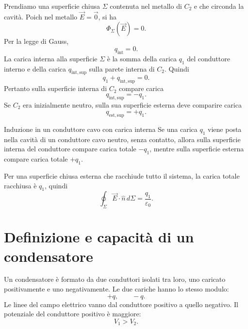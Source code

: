 \documentclass[a4paper]{article}
\begin{document}
Prendiamo una superficie chiusa \(\Sigma\) contenuta nel metallo di \(C_2\) e che circonda la cavità. Poich nel metallo \(\vec{E}=\vec{0}\), si ha
\[
    \Phi_\Sigma(\vec{E})=0.
\]
Per la legge di Gauss,
\[
    q_{\mathrm{int}}=0.
\]
La carica interna alla superficie \(\Sigma\) è la somma della carica \(q_1\) del conduttore interno e della carica \(q_{\mathrm{int,sup}}\) sulla parete interna di \(C_2\). Quindi
\[
    q_1+q_{\mathrm{int,sup}}=0.
\]
Pertanto sulla superficie interna di \(C_2\) compare carica
\[
    q_{\mathrm{int,sup}}=-q_1.
\]
Se \(C_2\) era inizialmente neutro, sulla sua superficie esterna deve comparire carica
\[
    q_{\mathrm{est,sup}}=+q_1.
\]

\begin{snippettheorem}{Induzione in un conduttore cavo con carica interna}
    Se una carica \(q_1\) viene posta nella cavità di un conduttore cavo neutro, senza contatto, allora sulla superficie interna del conduttore compare carica totale \(-q_1\), mentre sulla superficie esterna compare carica totale \(+q_1\).
\end{snippettheorem}

Per una superficie chiusa esterna che racchiude tutto il sistema, la carica totale racchiusa è \(q_1\), quindi
\[
    \oint_\Sigma \vec{E}\cdot\hat{n}\,d\Sigma=\frac{q_1}{\varepsilon_0}.
\]

\section{Definizione e capacità di un condensatore}

Un condensatore è formato da due conduttori isolati tra loro, uno caricato positivamente e uno negativamente. Le due cariche hanno lo stesso modulo:
\[
    +q,
    \qquad
    -q.
\]
Le linee del campo elettrico vanno dal conduttore positivo a quello negativo. Il potenziale del conduttore positivo è maggiore:
\[
    V_1>V_2.
\]

\begin{center}
\end{center}
\end{document}
